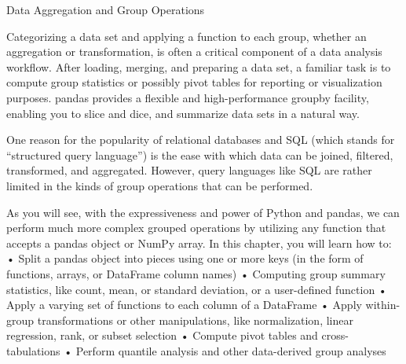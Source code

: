 Data Aggregation and Group Operations


Categorizing a data set and applying a function to each group, whether an aggregation
or transformation, is often a critical component of a data analysis workflow. After
loading, merging, and preparing a data set, a familiar task is to compute group statistics
or possibly pivot tables for reporting or visualization purposes. pandas provides a flexible
and high-performance groupby facility, enabling you to slice and dice, and summarize
data sets in a natural way.

One reason for the popularity of relational databases and SQL (which stands for
“structured query language”) is the ease with which data can be joined, filtered, transformed,
and aggregated. However, query languages like SQL are rather limited in the
kinds of group operations that can be performed. 

As you will see, with the expressiveness
and power of Python and pandas, we can perform much more complex grouped
operations by utilizing any function that accepts a pandas object or NumPy array. In
this chapter, you will learn how to:
• Split a pandas object into pieces using one or more keys (in the form of functions,
arrays, or DataFrame column names)
• Computing group summary statistics, like count, mean, or standard deviation, or
a user-defined function
• Apply a varying set of functions to each column of a DataFrame
• Apply within-group transformations or other manipulations, like normalization,
linear regression, rank, or subset selection
• Compute pivot tables and cross-tabulations
• Perform quantile analysis and other data-derived group analyses

